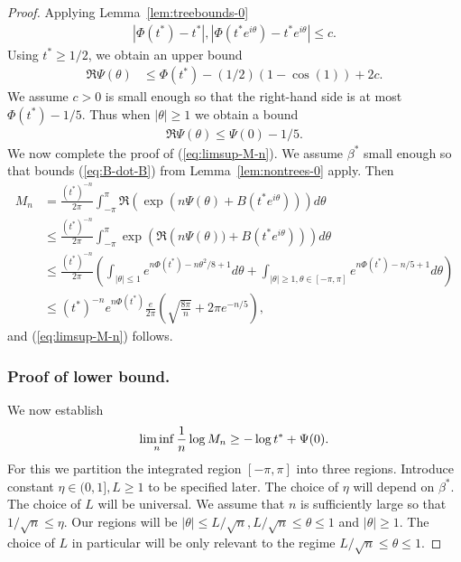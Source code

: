 \documentclass[12pt]{article}
\newcommand{\lr}[1]{\left(#1\right)}
\begin{document}
\begin{proof}
Applying Lemma~\ref{lem:treebounds-0}
\begin{align*}
|\Phi(t^*) - t^*|, | \Phi(t^*e^{i\theta}) - t^* e^{i\theta} |\le c.
\end{align*}
Using $t^*\ge 1/2$, we obtain an upper bound
\begin{align*}
\Re \Psi(\theta) & \le \Phi(t^*)-(1/2)(1-\cos(1))+2c.
\end{align*}
We assume $c>0$ is small enough so that the right-hand side is at most $\Phi(t^*)-1/5$. Thus when $|\theta|\ge 1$ we obtain a bound
\begin{align}\label{eq:theta-greater-1}
\Re\Psi(\theta)\le \Psi(0)-1/5.
\end{align}
We now complete the proof of (\ref{eq:limsup-M-n}). We assume $\beta^*$ small enough so that bounds (\ref{eq:B-dot-B}) from Lemma~\ref{lem:nontrees-0}
apply. Then
\begin{align*}
M_n&=
\frac{(t^*)^{-n}}{2\pi}\int_{-\pi}^\pi \Re\left(\exp\left(n \Psi(\theta) + B(t^*e^{i\theta})\right)\right)d\theta\\
&\le
\frac{(t^*)^{-n}}{2\pi}\int_{-\pi}^\pi \exp\left( \Re\left(n\Psi(\theta)) + B(t^*e^{i\theta})\right)\right)d\theta\\
&\leq \frac{(t^*)^{-n}}{2\pi} \lr{\int_{|\theta| \leq 1} e^{n\Phi(t^*) - n\theta^2/8 + 1}d\theta 
+ \int_{|\theta| \geq 1, \theta\in [-\pi,\pi]} e^{n\Phi(t^*) - n/5 + 1} d\theta} \\
&\leq (t^*)^{-n} e^{n\Phi(t^*)}  \frac{e}{2\pi}\lr{\sqrt{\frac{8\pi}{n}} + 2\pi e^{-n/5}},
\end{align*}
and (\ref{eq:limsup-M-n}) follows.

\subsubsection{Proof of lower bound.}
We now establish
\begin{align}
\liminf_n {1\over n}\log M_{n}\ge -\log t^*+\Psi(0). \label{eq:liminf-M-n}
\end{align}
For this we  partition the integrated region $[-\pi,\pi]$ into three regions.
Introduce constant $\eta\in (0,1], L\ge 1$ to be specified later. The choice of $\eta$ will depend on $\beta^*$. The choice of $L$ will be universal.
We assume that $n$ is sufficiently large so that $1/\sqrt n \leq \eta$. 
Our regions will be $|\theta|\le L/\sqrt{n}, L/\sqrt{n}\le \theta\le 1$ and $|\theta|\ge 1$. The choice of $L$ in particular will be only relevant
to the regime $L/\sqrt{n}\le \theta\le 1$.


\end{proof}
\end{document}
